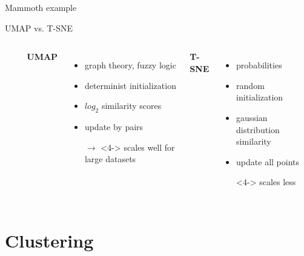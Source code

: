 \documentclass{irdbeamer}
\begin{document}
\begin{frame}{Mammoth example}
    
\end{frame}

\begin{frame}{UMAP vs. T-SNE}
\begin{columns}
\begin{column}{0.05\textwidth}
\begin{itemize}
    \item[] 
    \item[] 
    \item[] 
    \item[] 
    \item[] 
\end{itemize}
\end{column}
        \textbf{UMAP}
        \begin{itemize}
            \item<1-> graph theory, fuzzy logic
            \item<2-> determinist initialization
            \item<3-> $log_2$ similarity scores
            \item<4-> update by pairs 
            \item[$\rightarrow$]<4-> scales well for large datasets
        \end{itemize}
        \textbf{T-SNE}
        \begin{itemize}
            \item<1-> probabilities
            \item<2-> random initialization
            \item<3-> gaussian distribution similarity
            \item<4-> update all points
            \item[]<4-> scales less
        \end{itemize}
\end{columns}
\end{frame}


\section{Clustering}
\end{document}
